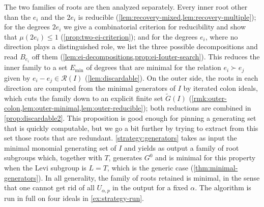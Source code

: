 \documentclass[11pt,letterpaper,reqno]{amsart}
\theoremstyle{remark}
\theoremstyle{definition}
\newcommand{\R}{\mathcal R}
\begin{document}
The two families of roots are then analyzed separately. Every inner root other than the
$e_i$ and the $2e_i$ is reducible (\cref{lem:recovery-mixed,lem:recovery-multiple}); for the
degrees $2e_i$ we give a combinatorial criterion for reducibility and show that
$\mu(2e_i)\leq1$ (\cref{prop:two-ei-criterion}); and for the degrees $e_i$, where no
direction plays a distinguished role, we list the three possible decompositions and read
$B_{e_i}$ off them (\cref{lem:ei-decompositions,prop:ei-Iouter-search}). This reduces the
inner family to a set $E_{\mathrm{min}}$ of degrees that are minimal for the relation
$e_i\succ e_j$ given by $e_i-e_j\in\R(I)$ (\cref{lem:discardable}). On the outer side, the
roots in each direction are computed from the minimal generators of $I$ by iterated colon
ideals, which cuts the family down to an explicit finite set $\widetilde G(I)$
(\cref{rmk:outer-colon,lem:outer-minimal,lem:outer-reducible}); both reductions are combined
in \cref{prop:discardable2}. This proposition is good enough for pinning a generating set that is quickly computable, but we go a bit further by trying to extract from this set those roots that are redundant. \cref{strategy:generators} takes as input the minimal monomial generating set of $I$ and yields as output a family of root subgroups which, together with $T$, generates $G^0$ and is minimal for this property when the Levi subgroup is $L=T$, which is the generic case (\cref{thm:minimal-generators}). In all generality, the family of roots retained is minimal, in the sense that one cannot get rid of all $U_{\alpha,p}$ in the output for a fixed $\alpha$. The algorithm is run in full on four ideals in
\cref{ex:strategy-run}.
\end{document}

